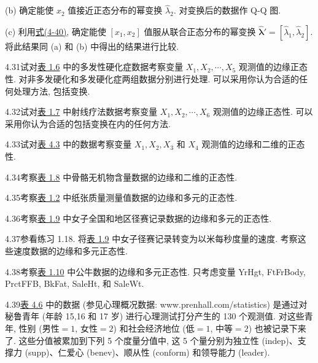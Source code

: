 (b) 确定能使 $x_{2}$ 值接近正态分布的幂变换 $\hat{\lambda}_{2}$. 对变换后的数据作 Q-Q 图.

(c) 利用\hyperref[eq:4-40]{式(4-40)}, 确定能使 $[x_{1},x_{2}]$ 值服从联合正态分布的幂变换 $\hat{\boldsymbol{\lambda}}'=[\hat{\lambda}_{1},\hat{\lambda}_{2}]$. 将此结果同 (a) 和 (b) 中得出的结果进行比较.

4.31\quad 试对\hyperref[tab:1.6]{表 1.6} 中的多发性硬化症数据考察变量 $X_{1},X_{2},\cdots,X_{5}$ 观测值的边缘正态性. 对非多发硬化和多发硬化症两组数据分别进行处理. 可以采用你认为合适的任何处理方法, 包括变换.

4.32\quad 试对\hyperref[tab:1.7]{表 1.7} 中射线疗法数据考察变量 $X_{1},X_{2},\cdots,X_{6}$ 观测值的边缘正态性. 可以采用你认为合适的包括变换在内的任何方法.

4.33\quad 试对\hyperref[tab:4.3]{表 4.3} 中的数据考察变量 $X_{1},X_{2},X_{3}$ 和 $X_{4}$ 观测值的边缘和二维的正态性.

4.34\quad 考察\hyperref[tab:1.8]{表 1.8} 中骨骼无机物含量数据的边缘和二维的正态性.

4.35\quad 考察\hyperref[tab:1.2]{表 1.2} 中纸张质量测量值数据的边缘和多元的正态性.

4.36\quad 考察\hyperref[tab:1.9]{表 1.9} 中女子全国和地区径赛记录数据的边缘和多元的正态性.

4.37\quad 参看练习 1.18. 将\hyperref[tab:1.9]{表 1.9} 中女子径赛记录转变为以米每秒度量的速度. 考察这些速度数据的边缘和多元正态性.

4.38\quad 考察\hyperref[tab:1.10]{表 1.10} 中公牛数据的边缘和多元正态性. 只考虑变量 YrHgt, FtFrBody, PrctFFB, BkFat, SaleHt, 和 SaleWt.

4.39\quad \hyperref[tab:4.6]{表 4.6} 中的数据 (参见心理概况数据: www.prenhall.com/statistics) 是通过对秘鲁青年 (年龄 15,16 和 17 岁) 进行心理测试打分产生的 130 个观测值. 对这些青年, 性别 (男性$=1$, 女性$=2$) 和社会经济地位 (低$=1$, 中等$=2$) 也被记录下来了. 这些分值被累加到下列 5 个度量分值中, 这 5 个量分别为独立性 (indep)、支撑力 (supp)、仁爱心 (benev)、顺从性 (conform) 和领导能力 (leader).

